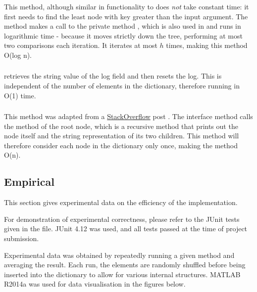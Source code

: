 \subsubsection{}
This method, although similar in functionality to  does \textit{not} take constant time: it first needs to find the least node with key greater than the input argument. The method makes a call to the private method , which is also used in  and runs in logarithmic time - because it moves strictly down the tree, performing at most two comparisons each iteration. It iterates at most $h$ times, making this method O(log n).

\subsubsection{}
 retrieves the string value of the  log field and then resets the log. This is independent of the number of elements in the dictionary, therefore running in O(1) time.

\subsubsection{}
This method was adapted from a \href{http://stackoverflow.com/}{StackOverflow} post \parencite{stackoverflow}. The interface method  calls the  method of the root node, which is a recursive method that prints out the node itself and the string representation of its two children. This method will therefore consider each node in the dictionary only once, making the method O(n).

\subsection{Empirical}

This section gives experimental data on the efficiency of the implementation.

For demonstration of experimental correctness, please refer to the JUnit tests given in the  file. JUnit 4.12 was used, and all tests passed at the time of project submission.

Experimental data was obtained by repeatedly running a given method and averaging the result. Each run, the elements are randomly shuffled before being inserted into the dictionary to allow for various internal structures. MATLAB R2014a was used for data visualisation in the figures below.

